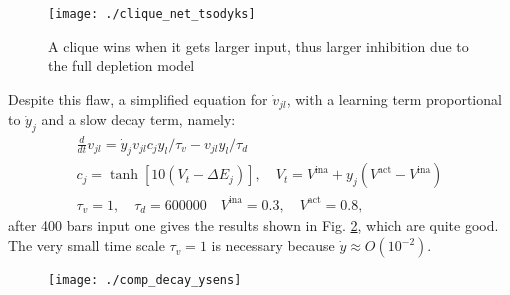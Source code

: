 \documentclass[10pt,a4paper]{article}
\begin{document}
		\begin{figure}
			\centering
			\texttt{[image: ./clique\_net\_tsodyks]}
			\label{fig:clique_net_tsodyks}
			\caption{A clique wins when it gets larger input, thus larger inhibition due to the full depletion model}
		\end{figure}
		
		Despite this flaw, a simplified equation for $\dot{v}_{jl}$, with a learning term proportional to $\dot{y}_j$ and a slow decay term, namely:
		\begin{gather}
		\frac{d}{dt} v_{jl} = \dot{y}_j v_{jl} c_j y_l / \tau_v  - v_{jl} y_l / \tau_d\\
		c_j = \tanh{\left[10 \left(V_t - \Delta E_j \right)\right]}, \quad V_t = V^{\text{ina}} + y_j \left(V^{\text{act}} - V^{\text{ina}}\right) \\ 
		\tau_v = 1, \quad \tau_d = 600 000 \quad V^{\text{ina}} = 0.3, \quad V^{\text{act}} = 0.8,	
		\end{gather}
		after 400 bars input one gives the results shown in Fig. \ref{fig:comp_decay_ysens}, which are quite good.
		The very small time scale $\tau_v = 1$ is necessary because $\dot{y} \approx O\left(10^{-2}\right)$.
		
		\begin{figure}
			\centering
			\texttt{[image: ./comp\_decay\_ysens]}
			\label{fig:comp_decay_ysens}
			\caption{}
		\end{figure}
		
		\newpage
		\printbibliography
\end{document}
